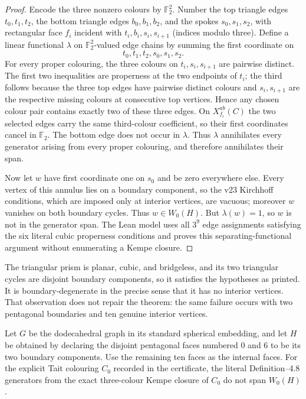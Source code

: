 \begin{proof}
Encode the three nonzero colours by $\mathbb F_2^2$.  Number the top triangle
edges $t_0,t_1,t_2$, the bottom triangle edges $b_0,b_1,b_2$, and the spokes
$s_0,s_1,s_2$, with rectangular face $f_i$ incident with
$t_i,b_i,s_i,s_{i+1}$ (indices modulo three).  Define a linear functional
$\lambda$ on $\mathbb F_2^2$-valued edge chains by summing the first coordinate
on
\[
                    t_0,t_1,t_2,s_0,s_1,s_2.
\]
For every proper colouring, the three colours on
$t_i,s_i,s_{i+1}$ are pairwise distinct.  The first two inequalities are
properness at the two endpoints of $t_i$; the third follows because the three
top edges have pairwise distinct colours and $s_i,s_{i+1}$ are the respective
missing colours at consecutive top vertices.  Hence any chosen colour pair
contains exactly two of these three edges.  On $X_{f_i}^{ab}(C)$ the two
selected edges carry the same third-colour coefficient, so their first
coordinates cancel in $\mathbb F_2$.  The bottom edge does not occur in
$\lambda$.  Thus $\lambda$ annihilates every generator arising from every
proper colouring, and therefore annihilates their span.

Now let $w$ have first coordinate one on $s_0$ and be zero everywhere else.
Every vertex of this annulus lies on a boundary component, so the v23
Kirchhoff conditions, which are imposed only at interior vertices, are
vacuous; moreover $w$ vanishes on both boundary cycles.  Thus $w\in W_0(H)$.
But $\lambda(w)=1$, so $w$ is not in the generator span.  The Lean model uses
all $3^9$ edge assignments satisfying the six literal cubic properness
conditions and proves this separating-functional argument without enumerating
a Kempe closure.
\end{proof}

The triangular prism is planar, cubic, and bridgeless, and its two triangular
cycles are disjoint boundary components, so it satisfies the hypotheses as
printed.  It is boundary-degenerate in the precise sense that it has no
interior vertices.  That observation does not repair the theorem: the same
failure occurs with two pentagonal boundaries and ten genuine interior
vertices.

\begin{proposition}
\label{prop:v23-dodecahedral-spanning-counterexample}
Let $G$ be the dodecahedral graph in its standard spherical embedding, and
let $H$ be obtained by declaring the disjoint pentagonal faces numbered $0$
and $6$ to be its two boundary components.  Use the remaining ten faces as
the internal faces.  For the explicit Tait colouring $C_0$ recorded in the
certificate, the literal Definition--4.8 generators from the exact
three-colour Kempe closure of $C_0$ do not span $W_0(H)$.
\end{proposition}

